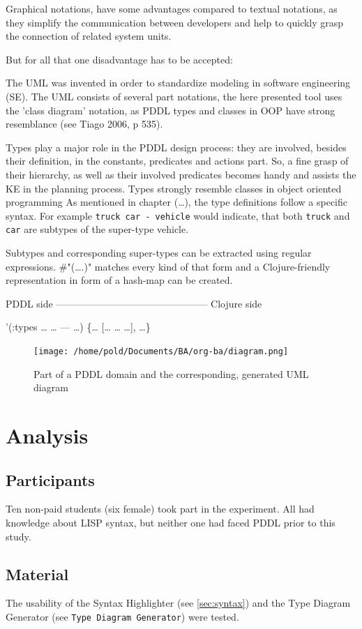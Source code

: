 \documentclass[11pt]{article}
\begin{document}
Graphical notations, have some advantages compared to textual
notations, as they simplify the communication between developers and
help to quickly grasp the connection of related system units. 

But for all that one disadvantage has to be accepted: 

The UML was invented in order to standardize modeling in software
engineering (SE). The UML consists of several part notations, the here
presented tool uses the 'class diagram' notation, as PDDL types and
classes in OOP have strong resemblance (see Tiago 2006, p 535). 

Types play a major role in the PDDL design process: they are involved,
besides their definition, in the constants, predicates and actions
part. So, a fine grasp of their hierarchy, as well as their involved
predicates becomes handy and assists the KE in the planning process.
Types strongly resemble classes in object oriented programming
As mentioned in chapter (\ldots{}), the type definitions follow a specific
syntax. For example \verb~truck car - vehicle~ would indicate, that both
\verb~truck~ and \verb~car~ are subtypes of the super-type vehicle. 

Subtypes and corresponding super-types can be extracted using regular
expressions. \#"(\ldots{}.)" matches every kind of that form and a
Clojure-friendly representation in form of a hash-map can be created.

PDDL side ----------------------------------------------- Clojure side

'(:types \ldots{} \ldots{} --- \ldots{})                      \{\ldots{} [\ldots{} \ldots{} \ldots{}], \ldots{}\}

\begin{figure}[htb]
\centering
\texttt{[image: /home/pold/Documents/BA/org-ba/diagram.png]}
\caption{Part of a PDDL domain and the corresponding, generated UML diagram}
\end{figure}
\section{Analysis}
\label{sec-5}
\subsection{Participants}
\label{sec-5-1}
Ten non-paid students (six female) took part in the experiment. All
had knowledge about LISP syntax, but neither one had faced PDDL prior
to this study. 
\subsection{Material}
\label{sec-5-2}
The usability of the Syntax Highlighter (see \ref{sec:syntax}) and the Type
Diagram Generator (see \texttt{Type Diagram Generator}) were
tested.
\end{document}
